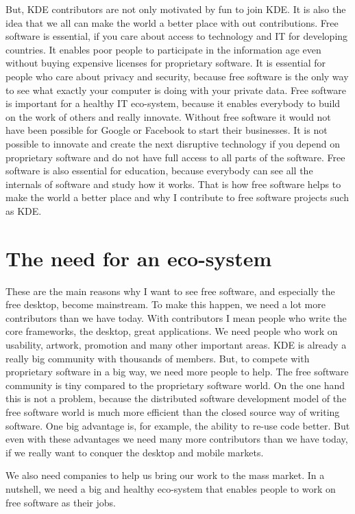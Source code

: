 But, KDE contributors are not only motivated by fun to join KDE. It is also the idea that we all can make the world a better place with out contributions. Free software is essential, if you care about access to technology and IT for developing countries. It enables poor people to participate in the information age even without buying expensive licenses for proprietary software. It is essential for people who care about privacy and security, because free software is the only way to see what exactly your computer is doing with your private data. Free software is important for a healthy IT eco-system, because it enables everybody to build on the work of others and really innovate. Without free software it would not have been possible for Google or Facebook to start their businesses. It is not possible to innovate and create the next disruptive technology if you depend on proprietary software and do not have full access to all parts of the software.
Free software is also essential for education, because everybody can see all the internals of software and study how it works. That is how free software helps to make the world a better place and why I contribute to free software projects such as KDE. 

\section*{The need for an eco-system}

These are the main reasons why I want to see free software, and especially the free desktop, become mainstream. To make this happen, we need a lot more contributors than we have today. With contributors I mean people who write the core frameworks, the desktop, great applications. We need people who work on usability, artwork, promotion and many other important areas. KDE is already a really big community with thousands of members. But, to compete with proprietary software in a big way, we need more people to help. The free software community is tiny compared to the proprietary software world. On the one hand this is not a problem, because the distributed software development model of the free software world is much more efficient than the closed source way of writing software. One big advantage is, for example, the ability to re-use code better. But even with these advantages we need many more contributors than we have today, if we really want to conquer the desktop and mobile markets.

We also need companies to help us bring our work to the mass market. In a nutshell, we need a big and healthy eco-system that enables people to work on free software as their jobs.

